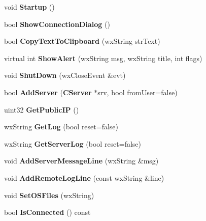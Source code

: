 \begin{DoxyCompactItemize}
\item 
void {\bfseries Startup} ()\label{classCamuleRemoteGuiApp_a9c51a628b40f36e3d75c52c98c226891}

\item 
bool {\bfseries ShowConnectionDialog} ()\label{classCamuleRemoteGuiApp_adab5b30299bdddab5a74dd77be5cb39f}

\item 
bool {\bfseries CopyTextToClipboard} (wxString strText)\label{classCamuleRemoteGuiApp_afd4f82501852cba3bc3eeb0d5f9d0c51}

\item 
virtual int {\bfseries ShowAlert} (wxString msg, wxString title, int flags)\label{classCamuleRemoteGuiApp_a20bb9077bc419328bbc030b816d9691f}

\item 
void {\bfseries ShutDown} (wxCloseEvent \&evt)\label{classCamuleRemoteGuiApp_ad94094e0bd988f1f4831fb32efb11c7d}

\item 
bool {\bfseries AddServer} ({\bf CServer} $\ast$srv, bool fromUser=false)\label{classCamuleRemoteGuiApp_a5ddb783dea8ce4a76f5868ab31898e47}

\item 
uint32 {\bfseries GetPublicIP} ()\label{classCamuleRemoteGuiApp_a042465df8599360cfdcd67ecdca07706}

\item 
wxString {\bfseries GetLog} (bool reset=false)\label{classCamuleRemoteGuiApp_a28f769ccf27902e7a19d70ca60ed9739}

\item 
wxString {\bfseries GetServerLog} (bool reset=false)\label{classCamuleRemoteGuiApp_ad88d544404b847e6bcb5b2507470f911}

\item 
void {\bfseries AddServerMessageLine} (wxString \&msg)\label{classCamuleRemoteGuiApp_aa218958c639af3717654fc50c06aaf5e}

\item 
void {\bfseries AddRemoteLogLine} (const wxString \&line)\label{classCamuleRemoteGuiApp_ae09d24a41e30358b702b7d22b7fd9c18}

\item 
void {\bfseries SetOSFiles} (wxString)\label{classCamuleRemoteGuiApp_acdd6120e42b4c6d69829a7a3872b5b1a}

\item 
bool {\bfseries IsConnected} () const \label{classCamuleRemoteGuiApp_acd82972b4937f522cac362b8e29dc7ad}


\end{DoxyCompactItemize}
